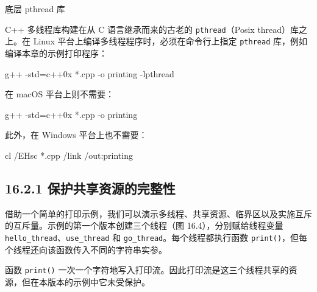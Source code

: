 \begin{mySidebar}{底层 pthread 库}

C++ 多线程库构建在从 C 语言继承而来的古老的 \texttt{pthread}（Posix thread）库之上。在 Linux 平台上编译多线程程序时，必须在命令行上指定 \texttt{pthread} 库，例如编译本章的示例打印程序：

\begin{codebox}
g++ -std=c++0x *.cpp -o printing -lpthread
\end{codebox}

在 macOS 平台上则不需要：

\begin{codebox}
g++ -std=c++0x *.cpp -o printing
\end{codebox}

此外，在 Windows 平台上也不需要：

\begin{codebox}
cl /EHsc *.cpp /link /out:printing
\end{codebox}
\end{mySidebar}

\subsection{16.2.1 保护共享资源的完整性}

借助一个简单的打印示例，我们可以演示多线程、共享资源、临界区以及实施互斥的互斥量。示例的第一个版本创建三个线程（图 16.4），分别赋给线程变量 \texttt{hello\_\allowbreak{}thread}、\texttt{use\_\allowbreak{}thread} 和 \texttt{go\_\allowbreak{}thread}。每个线程都执行函数 \texttt{print()}，但每个线程还向该函数传入不同的字符串实参。


函数 \texttt{print()} 一次一个字符地写入打印流。因此打印流是这三个线程共享的资源，但在本版本的示例中它未受保护。

